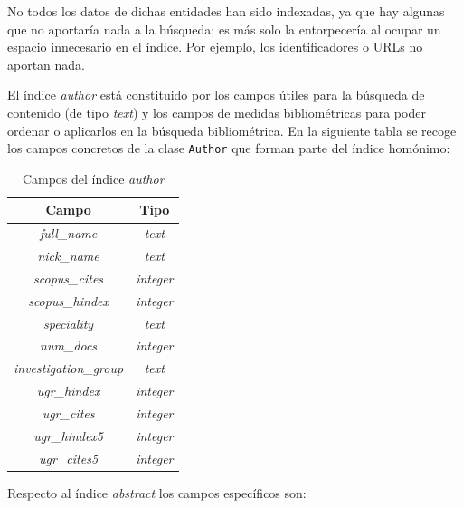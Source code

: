 No todos los datos de dichas entidades han sido indexadas, ya que hay algunas que no aportaría nada a la búsqueda; es más solo la entorpecería al ocupar un espacio innecesario en el índice. Por ejemplo, los identificadores o \acrshort{URL}s no aportan nada.

El índice \textit{author} está constituido por los campos útiles para la búsqueda de contenido (de tipo \textit{text}) y los campos de medidas bibliométricas para poder ordenar o aplicarlos en la búsqueda bibliométrica. En la siguiente tabla se recoge los campos concretos de la clase \texttt{Author} que forman parte del índice homónimo:

\begin{table} [h!]
	\centering
	\begin{tabular}{| c | c |}
		\hline
		\textbf{Campo}                & \textbf{Tipo}    \\ \hline
		\textit{full\_name}           & \textit{text}    \\
		\textit{nick\_name}           & \textit{text}    \\
		\textit{scopus\_cites}        & \textit{integer} \\
		\textit{scopus\_hindex}       & \textit{integer} \\
		\textit{speciality}           & \textit{text}    \\
		\textit{num\_docs}            & \textit{integer} \\
		\textit{investigation\_group} & \textit{text}    \\
		\textit{ugr\_hindex}          & \textit{integer} \\
		\textit{ugr\_cites}           & \textit{integer} \\
		\textit{ugr\_hindex5}         & \textit{integer} \\
		\textit{ugr\_cites5}          & \textit{integer} \\ \hline
	\end{tabular}
	\caption{Campos del índice \textit{author}}
\end{table}

\newpage
Respecto al índice \textit{abstract} los campos específicos son:

